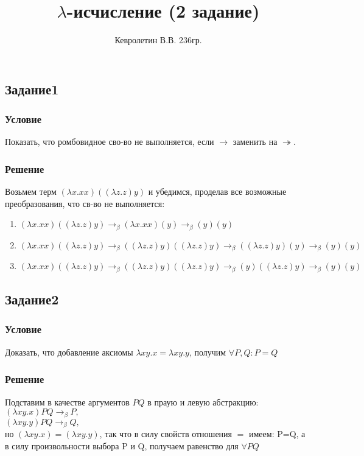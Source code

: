 \documentclass[10pt,a4paper]{article}
\author{Кевролетин В.В. 236гр.}
\title{$\lambda$-исчисление (2 задание)}
\begin{document}
\maketitle

\subsection*{Задание1}
\subsubsection*{Условие}
Показать, что ромбовидное сво-во не выполняется, если $\rightarrow $
заменить на $ \twoheadrightarrow $.
\subsubsection*{Решение}
Возьмем терм $(\lambda x.xx)((\lambda z.z)y)$ и убедимся, проделав все возможные
преобразования, что св-во не выполняется: \\
\begin{enumerate}
\item $(\lambda x.xx)((\lambda z.z)y) \longrightarrow_\beta (\lambda
  x.xx)(y) \longrightarrow_\beta (y)(y)$
\item $(\lambda x.xx)((\lambda z.z)y) \longrightarrow_\beta ((\lambda
  z.z)y)((\lambda z.z)y) \longrightarrow_\beta ((\lambda z.z)y)(y)
  \longrightarrow_\beta (y)(y)$
\item $(\lambda x.xx)((\lambda z.z)y) \longrightarrow_\beta ((\lambda
  z.z)y)((\lambda z.z)y) \longrightarrow_\beta (y)((\lambda z.z)y)
  \longrightarrow_\beta (y)(y)$
\end{enumerate}

\subsection*{Задание2}
\subsubsection*{Условие}
Доказать, что добавление аксиомы $\lambda xy.x = \lambda xy.y$,
получим $\forall P,Q: P=Q$
\subsubsection*{Решение}
Подставим в качестве аргументов $PQ$ в праую и левую абстракцию:\\
$(\lambda xy.x)PQ \longrightarrow_\beta P, $\\
$(\lambda xy.y)PQ \longrightarrow_\beta Q, $\\
но $(\lambda xy.x) = (\lambda xy.y)$, так что в силу свойств отношения
$=$ имеем: P=Q, а в силу произвольности выбора P и Q, получаем
равенство для $ \forall PQ $ \\
\end{document}
